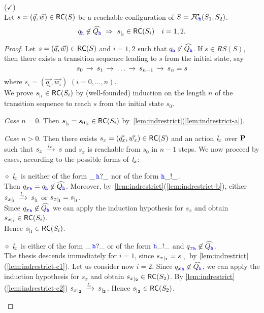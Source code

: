 \begin{lemma}($\checkmark$)
\label{lem:nohatrestrict}\hfill\\
Let $s= (\vec{q},\vec{w}) \in \mathsf{RC}(S)$ be a reachable configuration of 
$S ={\mathcal{F}\!\mathcal{C}}_{\!{\mathtt{\color{blue}{ {h}}}}}(S_1,S_2)$.
$${q}_{\mathtt{\color{blue}{ {h}}}}\not\in\widehat{Q_{\mathtt{\color{blue}{ {h}}}}} ~\Rightarrow~ 
{s}_{\mid_{\mathbf{i}}}\in \mathsf{RC}(S_i) \quad i=1,2.$$
\end{lemma}

\begin{proof}
Let $s = (\vec{q},\vec{w}) \in \mathsf{RC}(S)$ and $i=1,2$ such that ${q}_{{\mathtt{\color{blue}{ {h}}}}}\not\in\widehat{Q_{{\mathtt{\color{blue}{ {h}}}}}}$.
If $s \in RS(S)$, then there exists a transition sequence leading to $s$ from the initial state, say
$$s_0\,\xrightarrow{}_{{}}\,s_1\,\xrightarrow{}_{{}}\, \ldots\,\xrightarrow{}_{{}}\, s_{n-1}\,\xrightarrow{}_{{}}\,s_n=s$$
where $s_i = (\vec{q_i},\vec{w_i})$ $(i=0,\ldots,n)$.\\
We prove ${s}_{\mid_{\mathbf{i}}}\in \mathsf{RC}(S_i)$  by (well-founded) induction on the length $n$ of the transition sequence to reach $s$ from the initial state $s_0$.

{\em Case $n=0$}. Then ${s}_{\mid_{\mathbf{i}}} = {s_0}_{\mid_{\mathbf{i}}} \in \mathsf{RC}(S_i)$
by~\cref{lem:indrestrict}(\ref{lem:indrestrict-a}).


{\em Case $n>0$}.
Then there exists $s_x = (\vec{q_x},\vec{w_x}) \in \mathsf{RC}(S)$ and an action $\mathit{l}_x$ over $\mathbf{P}$
such that $s_x\,\xrightarrow{\mathit{l}_x}_{{}}\,s$ and $s_x$ is reachable from $s_0$ in $n-1$ steps.
We now proceed by cases, according to the possible forms of $\mathit{l}_x$:

\begin{description}
%
\item
\underline{$\diamond$}
$\mathit{l}_x$ is neither of the form $\_\,{\mathtt{\color{blue}{ {h}}}}?\_$ nor of the form ${\mathtt{\color{blue}{ {h}}}}\_!\_$.\\
Then ${q_x}_{{\mathtt{\color{blue}{ {h}}}}}={q}_{{\mathtt{\color{blue}{ {h}}}}}\not\in\widehat{Q_{{\mathtt{\color{blue}{ {h}}}}}}$.
Moreover, by~\cref{lem:indrestrict}(\ref{lem:indrestrict-b}),
either ${s_x}_{\mid_{\mathbf{i}}}\,\xrightarrow{\mathit{l}_x}_{{}}\,{s}_{\mid_{\mathbf{i}}}$ or  ${s_x}_{\mid_{\mathbf{i}}}={s}_{\mid_{\mathbf{i}}}$.\\
Since ${q_x}_{{\mathtt{\color{blue}{ {h}}}}}\not\in\widehat{Q_{{\mathtt{\color{blue}{ {h}}}}}}$ we can apply the induction hypothesis for $s_x$ and obtain ${s_x}_{\mid_{\mathbf{i}}}\in \mathsf{RC}(S_i)$.\\
Hence ${s}_{\mid_{\mathbf{i}}}\in \mathsf{RC}(S_i)$.
%
\item
\underline{$\diamond$}
$\mathit{l}_x$ is either of the form $\_\,{\mathtt{\color{blue}{ {h}}}}?\_$ or of the form ${\mathtt{\color{blue}{ {h}}}}\_!\_$
and ${q_x}_{\mathtt{\color{blue}{ {h}}}}\not\in\widehat{Q_{{\mathtt{\color{blue}{ {h}}}}}}$.\\
The thesis descends immediately for $i=1$, since  ${s_x}_{\mid_{\mathbf{1}}}={s}_{\mid_{\mathbf{1}}}$
by \cref{lem:indrestrict}(\ref{lem:indrestrict-c1}).
Let us consider now $i=2$. Since ${q_x}_{{\mathtt{\color{blue}{ {h}}}}}\not\in\widehat{Q_{{\mathtt{\color{blue}{ {h}}}}}}$, we can apply the induction hypothesis for $s_x$ and obtain ${s_x}_{\mid_{\mathbf{2}}}\in \mathsf{RC}(S_2)$.
By \cref{lem:indrestrict}(\ref{lem:indrestrict-c2}) ${s_x}_{\mid_{\mathbf{2}}}\,\xrightarrow{\mathit{l}_x}_{{}}\,{s}_{\mid_{\mathbf{2}}}$.
Hence ${s}_{\mid_{\mathbf{2}}}\in \mathsf{RC}(S_2)$.


\end{description}
\end{proof}
